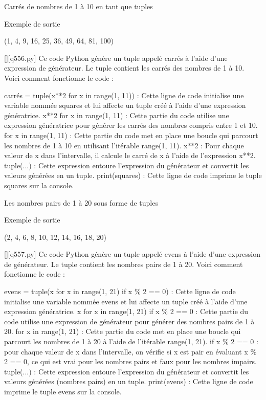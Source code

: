     \question
Carrés de nombres de 1 à 10 en tant que tuples

Exemple de sortie

(1, 4, 9, 16, 25, 36, 49, 64, 81, 100)
        \par
        \begin{solution}
            \renewcommand{\nomfichier}{q556.py}
            \pythonfile{\chemincode \nomfichier}[][\nomfichier]
            Ce code Python génère un tuple appelé carrés à l'aide d'une expression de générateur. Le tuple contient les carrés des nombres de 1 à 10. Voici comment fonctionne le code :

    carrés = tuple(x**2 for x in range(1, 11)) : Cette ligne de code initialise une variable nommée squares et lui affecte un tuple créé à l'aide d'une expression génératrice.
        x**2 for x in range(1, 11) : Cette partie du code utilise une expression génératrice pour générer les carrés des nombres compris entre 1 et 10.
            for x in range(1, 11) : Cette partie du code met en place une boucle qui parcourt les nombres de 1 à 10 en utilisant l'itérable range(1, 11).
            x**2 : Pour chaque valeur de x dans l'intervalle, il calcule le carré de x à l'aide de l'expression x**2.
        tuple(...) : Cette expression entoure l'expression du générateur et convertit les valeurs générées en un tuple.
    print(squares) : Cette ligne de code imprime le tuple squares sur la console.
        \end{solution}
        

        \question
        Les nombres pairs de 1 à 20 sous forme de tuples

Exemple de sortie

(2, 4, 6, 8, 10, 12, 14, 16, 18, 20)
        \par
        \begin{solution}
            \renewcommand{\nomfichier}{q557.py}
            \pythonfile{\chemincode \nomfichier}[][\nomfichier]
            Ce code Python génère un tuple appelé evens à l'aide d'une expression de générateur. Le tuple contient les nombres pairs de 1 à 20. Voici comment fonctionne le code :

    evens = tuple(x for x in range(1, 21) if x \% 2 == 0) : Cette ligne de code initialise une variable nommée evens et lui affecte un tuple créé à l'aide d'une expression génératrice.
        x for x in range(1, 21) if x \% 2 == 0 : Cette partie du code utilise une expression de générateur pour générer des nombres pairs de 1 à 20.
            for x in range(1, 21) : Cette partie du code met en place une boucle qui parcourt les nombres de 1 à 20 à l'aide de l'itérable range(1, 21).
            if x \% 2 == 0 : pour chaque valeur de x dans l'intervalle, on vérifie si x est pair en évaluant x \% 2 == 0, ce qui est vrai pour les nombres pairs et faux pour les nombres impairs.
        tuple(...) : Cette expression entoure l'expression du générateur et convertit les valeurs générées (nombres pairs) en un tuple.
    print(evens) : Cette ligne de code imprime le tuple evens sur la console.
        \end{solution}
        

